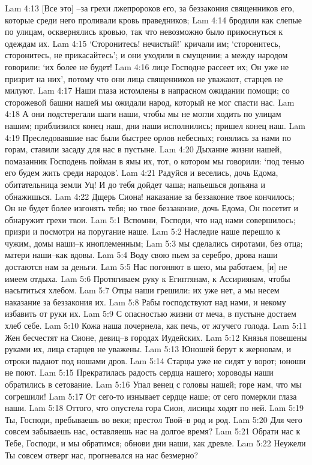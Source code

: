 Lam 4:13  [Все это] --за грехи лжепророков его, за беззакония священников его, которые среди него проливали кровь праведников;
Lam 4:14  бродили как слепые по улицам, осквернялись кровью, так что невозможно было прикоснуться к одеждам их.
Lam 4:15  `Сторонитесь! нечистый!' кричали им; `сторонитесь, сторонитесь, не прикасайтесь'; и они уходили в смущении; а между народом говорили: `их более не будет!
Lam 4:16  лице Господне рассеет их; Он уже не призрит на них', потому что они лица священников не уважают, старцев не милуют.
Lam 4:17  Наши глаза истомлены в напрасном ожидании помощи; со сторожевой башни нашей мы ожидали народ, который не мог спасти нас.
Lam 4:18  А они подстерегали шаги наши, чтобы мы не могли ходить по улицам нашим; приблизился конец наш, дни наши исполнились; пришел конец наш.
Lam 4:19  Преследовавшие нас были быстрее орлов небесных; гонялись за нами по горам, ставили засаду для нас в пустыне.
Lam 4:20  Дыхание жизни нашей, помазанник Господень пойман в ямы их, тот, о котором мы говорили: `под тенью его будем жить среди народов'.
Lam 4:21  Радуйся и веселись, дочь Едома, обитательница земли Уц! И до тебя дойдет чаша; напьешься допьяна и обнажишься.
Lam 4:22  Дщерь Сиона! наказание за беззаконие твое кончилось; Он не будет более изгонять тебя; но твое беззаконие, дочь Едома, Он посетит и обнаружит грехи твои.
Lam 5:1  Вспомни, Господи, что над нами совершилось; призри и посмотри на поругание наше.
Lam 5:2  Наследие наше перешло к чужим, домы наши--к иноплеменным;
Lam 5:3  мы сделались сиротами, без отца; матери наши--как вдовы.
Lam 5:4  Воду свою пьем за серебро, дрова наши достаются нам за деньги.
Lam 5:5  Нас погоняют в шею, мы работаем, [и] не имеем отдыха.
Lam 5:6  Протягиваем руку к Египтянам, к Ассириянам, чтобы насытиться хлебом.
Lam 5:7  Отцы наши грешили: их уже нет, а мы несем наказание за беззакония их.
Lam 5:8  Рабы господствуют над нами, и некому избавить от руки их.
Lam 5:9  С опасностью жизни от меча, в пустыне достаем хлеб себе.
Lam 5:10  Кожа наша почернела, как печь, от жгучего голода.
Lam 5:11  Жен бесчестят на Сионе, девиц--в городах Иудейских.
Lam 5:12  Князья повешены руками их, лица старцев не уважены.
Lam 5:13  Юношей берут к жерновам, и отроки падают под ношами дров.
Lam 5:14  Старцы уже не сидят у ворот; юноши не поют.
Lam 5:15  Прекратилась радость сердца нашего; хороводы наши обратились в сетование.
Lam 5:16  Упал венец с головы нашей; горе нам, что мы согрешили!
Lam 5:17  От сего-то изнывает сердце наше; от сего померкли глаза наши.
Lam 5:18  Оттого, что опустела гора Сион, лисицы ходят по ней.
Lam 5:19  Ты, Господи, пребываешь во веки; престол Твой--в род и род.
Lam 5:20  Для чего совсем забываешь нас, оставляешь нас на долгое время?
Lam 5:21  Обрати нас к Тебе, Господи, и мы обратимся; обнови дни наши, как древле.
Lam 5:22  Неужели Ты совсем отверг нас, прогневался на нас безмерно?


